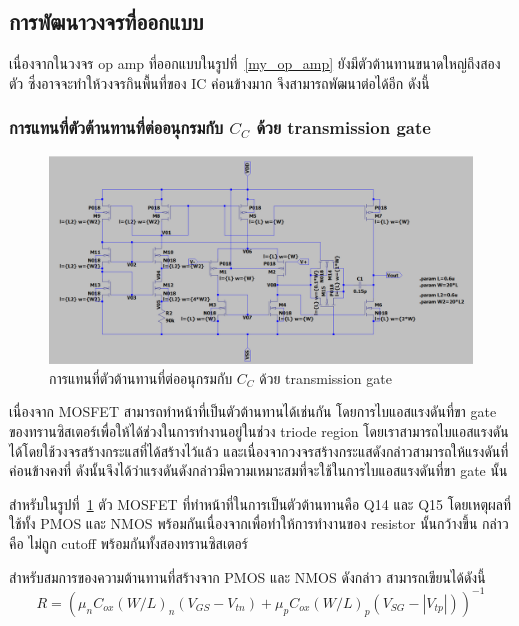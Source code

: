 \documentclass[a4paper, 11pt, oneside]{book} %
\begin{document}
\subsection{การพัฒนาวงจรที่ออกแบบ}

เนื่องจากในวงจร op amp ที่ออกแบบในรูปที่~\ref{my_op_amp} ยังมีตัวต้านทานขนาดใหญ่ถึงสองตัว ซึ่งอาจจะทำให้วงจรกินพื้นที่ของ IC ค่อนข้างมาก จึงสามารถพัฒนาต่อได้อีก ดังนี้

\subsubsection{การแทนที่ตัวต้านทานที่ต่ออนุกรมกับ $C_C$ ด้วย transmission gate}

\begin{figure}[h]
    \centering
    \includegraphics[width = \linewidth]{opamp-improve-1}
    \caption{การแทนที่ตัวต้านทานที่ต่ออนุกรมกับ $C_C$ ด้วย transmission gate}
    \label{opamp-improve-1}
\end{figure}

เนื่องจาก MOSFET สามารถทำหน้าที่เป็นตัวต้านทานได้เช่นกัน โดยการไบแอสแรงดันที่ขา gate ของทรานซิสเตอร์เพื่อให้ได้ช่วงในการทำงานอยู่ในช่วง triode region โดยเราสามารถไบแอสแรงดันได้โดยใช้วงจรสร้างกระแสที่ได้สร้างไว้แล้ว และเนื่องจากวงจรสร้างกระแสดังกล่าวสามารถให้แรงดันที่ค่อนข้างคงที่ ดังนั้นจึงได้ว่าแรงดันดังกล่าวมีความเหมาะสมที่จะใช้ในการไบแอสแรงดันที่ขา gate นั้น

สำหรับในรูปที่~\ref{opamp-improve-1} ตัว MOSFET ที่ทำหน้าที่ในการเป็นตัวต้านทานคือ Q14 และ Q15 โดยเหตุผลที่ใช้ทั้ง PMOS และ NMOS พร้อมกันเนื่องจากเพื่อทำให้การทำงานของ resistor นั้นกว้างขึ้น กล่าวคือ ไม่ถูก cutoff พร้อมกันทั้งสองทรานซิสเตอร์ \cite{Nath17}

สำหรับสมการของความต้านทานที่สร้างจาก PMOS และ NMOS ดังกล่าว สามารถเขียนได้ดังนี้ \cite{Nath17}
$$R = (\mu_n C_{ox} (W/L)_n (V_{GS}-V_{tn}) + \mu_p C_{ox} (W/L)_p (V_{SG}-|V_{tp}|))^{-1}$$
\end{document}
